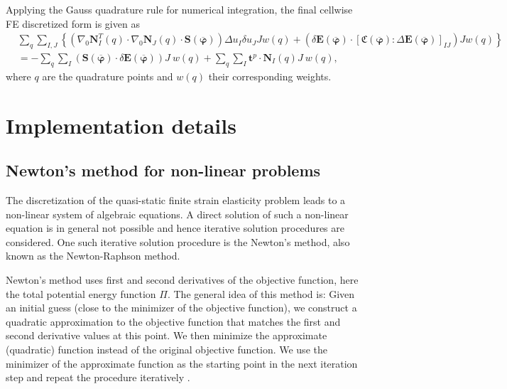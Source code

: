 Applying the Gauss quadrature rule for numerical integration, the final cellwise FE discretized form is given as
\begin{align}
&\sum\limits_q \sum\limits_{I,J} \left\lbrace \left(\nabla_0 \mathbf{N}^T_I(q) \cdot \nabla_0 \mathbf{N}_J(q) \cdot \mathbf{S}(\overline{\bm{\varphi}}) \right) \Delta u_I \delta u_J J w(q) + \left( \delta \mathbf{E}(\overline{\bm{\varphi}}) \cdot \left[ \mathfrak{C}(\overline{\bm{\varphi}}) : \Delta \mathbf{E}(\overline{\bm{\varphi}}) \right]_{IJ} \right) J w(q) \right\rbrace \nonumber \\
&= -\sum\limits_q \sum\limits_{I} \left( \mathbf{S}(\overline{\bm{\varphi}}) \cdot \delta \mathbf{E}(\overline{\bm{\varphi}}) \right) J \ w(q) + \sum\limits_q \sum\limits_{I} \mathbf{t}^p \cdot \mathbf{N}_I (q) J \ w(q),
\end{align}
where $q$ are the quadrature points and $w(q)$ their corresponding weights.  

\section{Implementation details}
\subsection{Newton's method for non-linear problems}
The discretization of the quasi-static finite strain elasticity problem leads to a non-linear system of algebraic equations. A direct solution of such a non-linear equation is in general not possible and hence iterative solution procedures are considered. One such iterative solution procedure is the Newton's method, also known as the Newton-Raphson method. \par 

Newton's method uses first and second derivatives of the objective function, here the total potential energy function $\Pi$. The general idea of this method is: Given an initial guess (close to the minimizer of the objective function), we construct a quadratic approximation to the objective function that matches the first and second derivative values at this point. We then minimize the approximate (quadratic) function instead of the original objective function. We use the minimizer of the approximate function as the starting point in the next iteration step and repeat the procedure iteratively \cite{EdwinK.P.Chong2013}. \par

